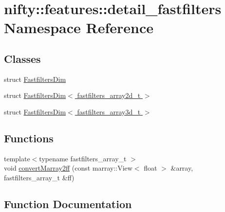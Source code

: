 \hypertarget{namespacenifty_1_1features_1_1detail__fastfilters}{}\section{nifty\+:\+:features\+:\+:detail\+\_\+fastfilters Namespace Reference}
\label{namespacenifty_1_1features_1_1detail__fastfilters}
\subsection*{Classes}
\begin{DoxyCompactItemize}
\item 
struct \hyperlink{structnifty_1_1features_1_1detail__fastfilters_1_1FastfiltersDim}{Fastfilters\+Dim}
\item 
struct \hyperlink{structnifty_1_1features_1_1detail__fastfilters_1_1FastfiltersDim_3_01fastfilters__array2d__t_01_4}{Fastfilters\+Dim$<$ fastfilters\+\_\+array2d\+\_\+t $>$}
\item 
struct \hyperlink{structnifty_1_1features_1_1detail__fastfilters_1_1FastfiltersDim_3_01fastfilters__array3d__t_01_4}{Fastfilters\+Dim$<$ fastfilters\+\_\+array3d\+\_\+t $>$}
\end{DoxyCompactItemize}
\subsection*{Functions}
\begin{DoxyCompactItemize}
\item 
{\footnotesize template$<$typename fastfilters\+\_\+array\+\_\+t $>$ }\\void \hyperlink{namespacenifty_1_1features_1_1detail__fastfilters_a41cdd24872d9ad84d89616e7c68eec05}{convert\+Marray2ff} (const marray\+::\+View$<$ float $>$ \&array, fastfilters\+\_\+array\+\_\+t \&ff)
\end{DoxyCompactItemize}


\subsection{Function Documentation}
\hypertarget{namespacenifty_1_1features_1_1detail__fastfilters_a41cdd24872d9ad84d89616e7c68eec05}{}
